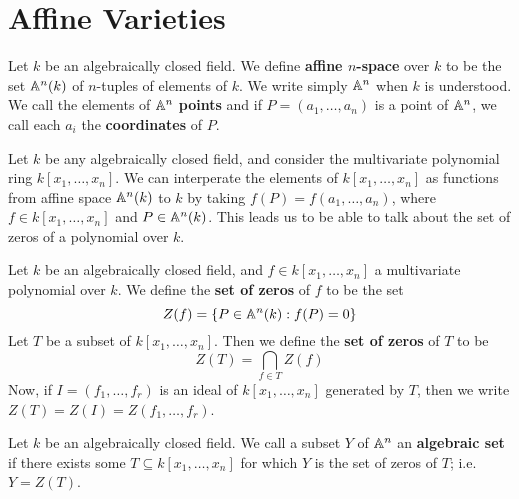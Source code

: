 \section{Affine Varieties}

\begin{definition}
    Let $k$ be an algebraically closed field. We define  \textbf{affine
    $n$-space} over $k$ to be the set $\mathbb{A}^n(k)$ of $n$-tuples of elements of
    $k$. We write simply $\mathbb{A}^n$ when  $k$ is understood. We call the elements of
    $\mathbb{A}^n$  \textbf{points} and if $P=(a_1, \dots, a_n)$ is a point of $\mathbb{A}^n$,
    we call each $a_i$ the \textbf{coordinates} of $P$.
\end{definition}

\begin{example}\label{example_1.1}
    Let $k$ be any algebraically closed field, and consider the multivariate
    polynomial ring $k[x_1, \dots, x_n]$. We can interperate the elements of
    $k[x_1, \dots, x_n]$ as functions from affine space $\mathbb{A}^n(k)$ to $k$ by
    taking  $f(P)=f(a_1, \dots, a_n)$, where $f \in k[x_1, \dots, x_n]$ and $P
    \in \mathbb{A}^n(k)$. This leads us to be able to talk about the set of zeros of a
    polynomial over $k$.
\end{example}

\begin{definition}
    Let $k$ be an algebraically closed field, and $f \in k[x_1, \dots, x_n]$ a
    multivariate polynomial over $k$. We define the \textbf{set of zeros} of $f$
    to be the set
    \begin{equation*}
        Z(f)=\{P \in \mathbb{A}^n(k) : f(P)=0\}
    \end{equation*}
    Let $T$ be a subset of  $k[x_1, \dots, x_n]$. Then we define the \textbf{set
    of zeros} of $T$ to be
    \begin{equation*}
        Z(T)=\bigcap_{f \in T}{Z(f)}
    \end{equation*}
    Now, if $I=(f_1, \dots, f_r)$ is an ideal of  $k[x_1, \dots, x_n]$ generated
    by $T$, then we write  $Z(T)=Z(I)=Z(f_1, \dots, f_r)$.
\end{definition}

\begin{definition}
    Let $k$ be an algebraically closed field. We call a subset $Y$ of $\mathbb{A}^n$ an
    \textbf{algebraic set} if there exists some $T \subseteq k[x_1, \dots, x_n]$
    for which $Y$ is the set of zeros of $T$; i.e. $Y=Z(T)$.
\end{definition}

